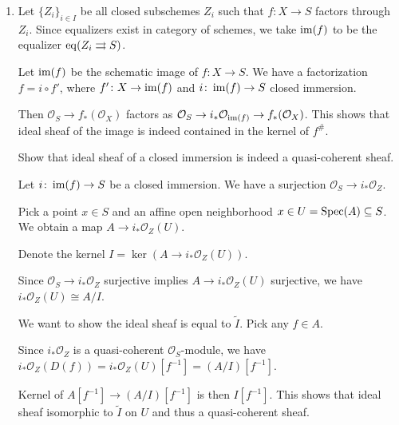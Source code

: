 \begin{exercise}{4}
    \begin{enumerate}
        \item{
            Let $\{Z_i\}_{i \in I}$ be all closed subschemes $Z_i$ such that $f
            \colon X \to S$ factors through $Z_i$. Since equalizers exist in
            category of schemes, we take $\operatorname{im}(f)$ to be the equalizer $\operatorname{eq}(Z_i
            \rightrightarrows S)$.

            Let $\operatorname{im}(f)$ be the schematic image of $f \colon X \to S$. We have a
            factorization $f = i \circ f'$, where $f' \colon X \to \operatorname{im}(f)$ and
            $i \colon \operatorname{im}(f) \to S$ closed immersion.

            Then $\mathcal{O}_S \to f_* (\mathcal{O}_X)$ factors as
            $\mathcal{O}_S \to i_* \mathcal{O}_{\operatorname{im}(f)} \to f_*
            (\mathcal{O}_X)$. This shows that ideal sheaf of the image is indeed
            contained in the kernel of $f^\#$.

            Show that ideal sheaf of a closed immersion is indeed a
            quasi-coherent sheaf.

            Let $i \colon \operatorname{im}(f) \to S$ be a closed immersion. We have a
            surjection $\mathcal{O}_S \to i_* \mathcal{O}_Z$.

            Pick a point $x \in S$ and an affine open neighborhood $x \in U =
            \operatorname{Spec}(A) \subseteq S$. We obtain a map $A \to i_* \mathcal{O}_Z
            (U)$.

            Denote the kernel $I = \ker(A \to i_* \mathcal{O}_Z (U))$.

            Since $\mathcal{O}_S \to i_* \mathcal{O}_Z$ surjective implies $A
            \to i_* \mathcal{O}_Z (U)$ surjective, we have $i_* \mathcal{O}_Z
            (U) \cong A / I$.

            We want to show the ideal sheaf is equal to $\tilde{I}$. Pick any $f
            \in A$.

            Since $i_* \mathcal{O}_Z$ is a quasi-coherent
            $\mathcal{O}_S$-module, we have $i_* \mathcal{O}_Z(D(f)) = i_*
            \mathcal{O}_Z(U)[f^{-1}] = (A/I)[f^{-1}]$.

            Kernel of $A[f^{-1}] \to (A/I)[f^{-1}]$ is then $I[f^{-1}]$. This
            shows that ideal sheaf isomorphic to $\tilde{I}$ on $U$ and thus a
            quasi-coherent sheaf.

}
\end{enumerate}
\end{exercise}
